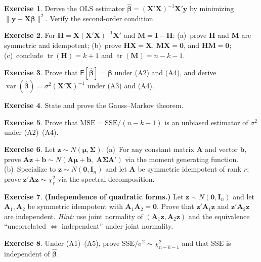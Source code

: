 \documentclass[14pt]{extarticle}
\theoremstyle{plain}
\theoremstyle{definition}
\newtheorem{exercise}{Exercise}
\theoremstyle{remark}
\newcommand\expc{\mathsf{E}}
\DeclareMathOperator\var{var}
\DeclareMathOperator\tr{tr}
\newcommand{\SSE}{\mathrm{SSE}}
\newcommand{\MSE}{\mathrm{MSE}}
\newcommand{\bX}{\mathbf{X}}
\newcommand{\by}{\mathbf{y}}
\def\bb{\boldsymbol{\beta}}
\newcommand{\bI}{\mathbf{I}}
\newcommand{\bH}{\mathbf{H}}
\newcommand{\bM}{\mathbf{M}}
\newcommand{\bzero}{\mathbf{0}}
\newcommand{\bz}{\mathbf{z}}
\newcommand{\bA}{\mathbf{A}}
\begin{document}
\begin{exercise}\label{ex:A3}
Derive the OLS estimator $\hat{\bb} = (\bX'\bX)^{-1}\bX'\by$ by minimizing $\|\by - \bX\bb\|^2$. Verify the second-order condition.
\end{exercise}

\begin{exercise}\label{ex:A4}
For $\bH = \bX(\bX'\bX)^{-1}\bX'$ and $\bM = \bI - \bH$: (a)~prove $\bH$ and $\bM$ are symmetric and idempotent; (b)~prove $\bH\bX = \bX$, $\bM\bX = \bzero$, and $\bH\bM = \bzero$; (c)~conclude $\tr(\bH) = k+1$ and $\tr(\bM) = n-k-1$.
\end{exercise}

\begin{exercise}\label{ex:A5}
Prove that $\expc[\hat{\bb}] = \bb$ under (A2) and (A4), and derive $\var(\hat{\bb}) = \sigma^2(\bX'\bX)^{-1}$ under (A3) and (A4).
\end{exercise}

\begin{exercise}\label{ex:A6}
State and prove the Gauss--Markov theorem.
\end{exercise}

\begin{exercise}\label{ex:A7}
Prove that $\MSE = \SSE/(n-k-1)$ is an unbiased estimator of $\sigma^2$ under (A2)--(A4).
\end{exercise}

\begin{exercise}\label{ex:A8}
Let $\bz \sim N(\boldsymbol\mu, \boldsymbol\Sigma)$. (a)~For any constant matrix $\bA$ and vector $\mathbf{b}$, prove $\bA\bz + \mathbf{b} \sim N(\bA\boldsymbol\mu + \mathbf{b},\;\bA\boldsymbol\Sigma\bA')$ via the moment generating function. (b)~Specialize to $\bz \sim N(\bzero, \bI_n)$ and let $\bA$ be symmetric idempotent of rank $r$; prove $\bz'\bA\bz \sim \chi^2_r$ via the spectral decomposition.
\end{exercise}

\begin{exercise}\label{ex:A9}
\textbf{(Independence of quadratic forms.)} Let $\bz \sim N(\bzero, \bI_n)$ and let $\bA_1, \bA_2$ be symmetric idempotent with $\bA_1\bA_2 = \bzero$. Prove that $\bz'\bA_1\bz$ and $\bz'\bA_2\bz$ are independent. \emph{Hint:} use joint normality of $(\bA_1\bz, \bA_2\bz)$ and the equivalence ``uncorrelated $\Leftrightarrow$ independent'' under joint normality.
\end{exercise}

\begin{exercise}\label{ex:A10}
Under (A1)--(A5), prove $\SSE/\sigma^2 \sim \chi^2_{n-k-1}$ and that $\SSE$ is independent of $\hat{\bb}$.
\end{exercise}
\end{document}
